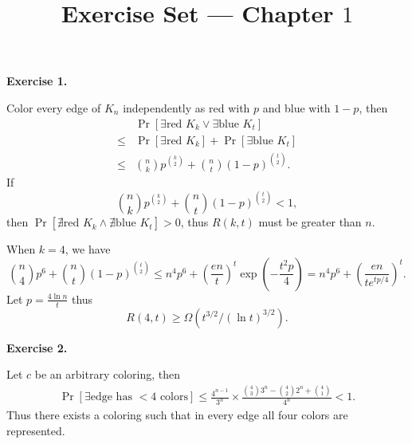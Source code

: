 \documentclass[a4paper]{article}
\title{Exercise Set --- Chapter $1$}
\date{}
\newenvironment{exercise}[1]{
	\par
	\noindent\textbf{Exercise #1.}\quad
}{
	\par
	\bigskip
}
\newcommand{\pbra}[1]{\left( #1 \right)}
\newcommand{\sbra}[1]{\left[ #1 \right]}
\begin{document}
\maketitle

\begin{exercise}{1}
    Color every edge of $K_n$ independently as red with $p$ and blue with $1-p$, then
    \begin{align*}
        &\Pr\sbra{\exists\text{red $K_k$}\lor\exists\text{blue $K_t$}}\\
        \leq&\Pr\sbra{\exists\text{red $K_k$}}+\Pr\sbra{\exists\text{blue $K_t$}}\\
        \leq&\binom nk p^{\binom k2}+\binom nt (1-p)^{\binom t2}.
    \end{align*}
    If 
    $$
    \binom nk p^{\binom k2}+\binom nt (1-p)^{\binom t2}<1,
    $$
    then $\Pr\sbra{\nexists\text{red $K_k$}\land\nexists\text{blue $K_t$}}>0$, thus $R(k,t)$ must be greater than $n$.

    When $k=4$, we have 
    $$
    \binom n4 p^6+\binom nt (1-p)^{\binom t2}\leq n^4p^6+\pbra{\frac{en}{t}}^t\exp\pbra{-\frac{t^2p}{4}}
    =n^4p^6+\pbra{\frac{en}{te^{tp/4}}}^t.
    $$
    Let $p=\frac{4\ln n}{t}$ thus 
    $$
    R(4,t)\geq\Omega\pbra{t^{3/2}/\pbra{\ln t}^{3/2}}.
    $$
\end{exercise}

\begin{exercise}{2}
    Let $c$ be an arbitrary coloring, then
    \begin{align*}
        \Pr\sbra{\exists\text{edge has $<4$ colors}}\leq\frac{4^{n-1}}{3^n}\times\frac{\binom43 3^n-\binom42 2^n+\binom41}{4^n}<1.
    \end{align*}
    Thus there exists a coloring such that in every edge all four colors are represented.
\end{exercise}
\end{document}
